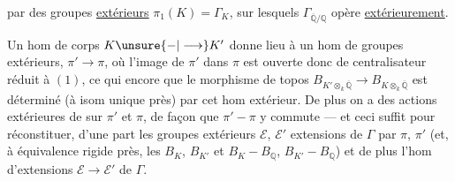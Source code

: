 par des groupes  \uline{extérieurs} $\pi_1(K)=\Gamma_K$, sur lesquels  $\Gamma_{\overline{\mathbb Q}/\mathbb Q}$ opère \uline{extérieurement}.

Un hom de corps $K\unsure{-|\longrightarrow}K'$ donne lieu à un hom de groupes extérieurs,
 $\pi'\longrightarrow\pi$, où l'image de $\pi'$ dans $\pi$ est ouverte donc de centralisateur réduit à $(1)$, ce qui  encore que le morphisme de topos $B_{K'\otimes_k\overline{\mathbb Q}}\longrightarrow B_{K\otimes_k\overline{\mathbb Q}}$ est déterminé (à isom unique près) par cet hom extérieur. De plus on a des actions extérieures de  sur $\pi'$ et $\pi$, de façon que $\pi'-\pi$ y commute --- et ceci suffit pour réconstituer, d'une part les groupes extérieurs $\mathcal E$, $\mathcal E'$ extensions  de $\Gamma$ par $\pi$, $\pi'$ (et, à équivalence rigide près, les $B_K$, $B_{K'}$ et $B_K-B_{\mathbb Q}$, $B_{K'}-B_{\mathbb Q}$) et de plus l'hom d'extensions  $\mathcal E\longrightarrow\mathcal E'$ de $\Gamma$.
